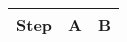 \documentclass{article}
\begin{document}
\begin{tabularx}{\textwidth}{l|X|X|}
\hline
Step&A&B\\
\hline
\end{tabularx}
\end{document}
